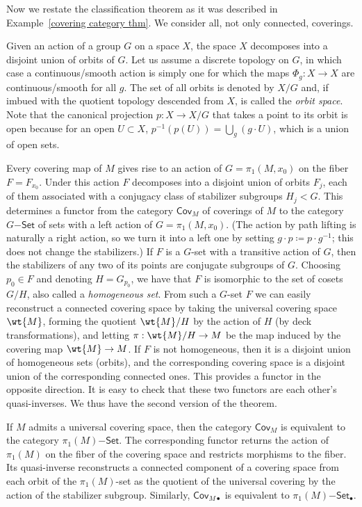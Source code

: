 Now we restate the classification theorem as it was described in Example~\ref{covering category thm}. We consider all, not only connected, coverings. 

Given an action of a group $G$ on a space $X$, the space $X$ decomposes into a disjoint union of orbits of $G$. Let us assume a discrete topology on $G$, in which case a continuous/smooth action is simply one for which the maps $\Phi_g:X\to X$ are continuous/smooth for all $g$. The set of all orbits is denoted by $X\slash G$ and, if imbued with the quotient topology descended from $X$, is called the \emph{orbit space}. Note that the canonical projection $p:X\to X\slash G$ that takes a point to its orbit is open because for an open $U\subset X$, $p^{-1}(p(U))=\bigcup_g (g\cdot U)$, which is a union of open sets.

Every covering map of $M$ gives rise to an action of $G=\pi_1(M,x_0)$ on the fiber $F=F_{x_0}$. Under this action $F$ decomposes into a disjoint union of orbits $F_j$, each of them associated with a conjugacy class of stabilizer subgroups $H_j<G$. This determines a functor from the category $\mathsf{Cov}_M$ of coverings of $M$ to the category $G\mathsf{-Set}$ of sets with a left action of $G=\pi_1(M,x_0)$. (The action by path lifting is naturally a right action, so we turn it into a left one by setting $g\cdot p\coloneqq p\cdot g^{-1}$; this does not change the stabilizers.) If $F$ is a $G$-set with a transitive action of $G$, then the stabilizers of any two of its points are conjugate subgroups of $G$. Choosing $p_0\in F$ and denoting $H=G_{p_0}$, we have that $F$ is isomorphic to the set of cosets $G\slash H$, also called a \emph{homogeneous set}. From such a $G$-set $F$ we can easily reconstruct a connected covering space by taking the universal covering space $\wt{M}$, forming the quotient $\wt{M}\slash H$ by the action of $H$ (by deck transformations), and letting $\pi:\wt{M}\slash H\to M$ be the map induced by the covering map $\wt{M}\to M$. If $F$ is not homogeneous, then it is a disjoint union of homogeneous sets (orbits), and the corresponding covering space is a disjoint union of the corresponding connected ones. This provides a functor in the opposite direction. It is easy to check that these two functors are each other's quasi-inverses. We thus have the second version of the theorem.

\begin{thm}\label{covering spaces category equivalence thm}
    If $M$ admits a universal covering space, then the category $\mathsf{Cov}_M$ is equivalent to the category $\pi_1(M)\mathsf{-Set}$. The corresponding functor returns the action of $\pi_1(M)$ on the fiber of the covering space and restricts morphisms to the fiber. Its quasi-inverse reconstructs a connected component of a covering space from each orbit of the $\pi_1(M)$-set as the quotient of the universal covering by the action of the stabilizer subgroup. Similarly, $\mathsf{Cov}_{M\bullet}$ is equivalent to $\pi_1(M)\mathsf{-Set}_\bullet$.
\end{thm}

